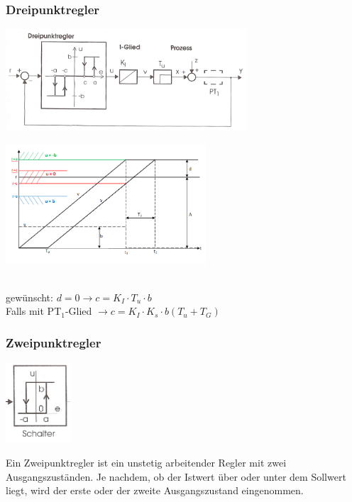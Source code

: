 	\subsubsection{Dreipunktregler}
		\begin{minipage}{9cm}
		\includegraphics[width=9cm]{./bilder/Dreipunktregler.jpg}
        \end{minipage}
		\begin{minipage}{7.5cm}
        \includegraphics[width=7.5cm]{./bilder/Dreipunktregler_dia.png}
        \end{minipage}\\
		gewünscht: $d = 0 \rightarrow c = K_I \cdot T_u \cdot b$\\
		Falls mit PT$_1$-Glied $\rightarrow c = K_I \cdot K_s \cdot b (T_u + T_G)$
		
		
	\subsubsection{Zweipunktregler}
		\begin{minipage}{3cm}
 		\includegraphics[height=3cm]{./bilder/Zweipunktregler.jpg}
        \end{minipage}
		\begin{minipage}{15cm}
        Ein Zweipunktregler ist ein unstetig arbeitender Regler mit zwei
        Ausgangszuständen. Je nachdem, ob der Istwert über oder unter dem
        Sollwert liegt, wird der erste oder der zweite Ausgangszustand
        eingenommen. 
        \end{minipage}
        
